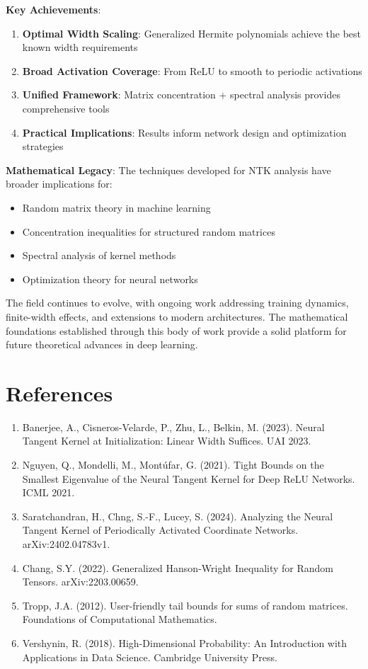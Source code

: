 \documentclass{article}
\begin{document}
\textbf{Key Achievements}:
\begin{enumerate}
    \item \textbf{Optimal Width Scaling}: Generalized Hermite polynomials achieve the best known width requirements
    \item \textbf{Broad Activation Coverage}: From ReLU to smooth to periodic activations
    \item \textbf{Unified Framework}: Matrix concentration + spectral analysis provides comprehensive tools
    \item \textbf{Practical Implications}: Results inform network design and optimization strategies
\end{enumerate}

\textbf{Mathematical Legacy}:
The techniques developed for NTK analysis have broader implications for:
\begin{itemize}
    \item Random matrix theory in machine learning
    \item Concentration inequalities for structured random matrices
    \item Spectral analysis of kernel methods
    \item Optimization theory for neural networks
\end{itemize}

The field continues to evolve, with ongoing work addressing training dynamics, finite-width effects, and extensions to modern architectures. The mathematical foundations established through this body of work provide a solid platform for future theoretical advances in deep learning.

\section*{References}

\begin{enumerate}
    \item Banerjee, A., Cisneros-Velarde, P., Zhu, L., Belkin, M. (2023). Neural Tangent Kernel at Initialization: Linear Width Suffices. UAI 2023.
    
    \item Nguyen, Q., Mondelli, M., Montúfar, G. (2021). Tight Bounds on the Smallest Eigenvalue of the Neural Tangent Kernel for Deep ReLU Networks. ICML 2021.
    
    \item Saratchandran, H., Chng, S.-F., Lucey, S. (2024). Analyzing the Neural Tangent Kernel of Periodically Activated Coordinate Networks. arXiv:2402.04783v1.
    
    \item Chang, S.Y. (2022). Generalized Hanson-Wright Inequality for Random Tensors. arXiv:2203.00659.
    
    \item Tropp, J.A. (2012). User-friendly tail bounds for sums of random matrices. Foundations of Computational Mathematics.
    
    \item Vershynin, R. (2018). High-Dimensional Probability: An Introduction with Applications in Data Science. Cambridge University Press.
\end{enumerate}
\end{document}
